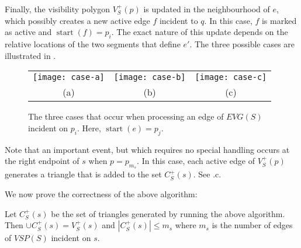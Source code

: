 \documentclass{patmorin}
\newcommand{\EVG}{\mathit{EVG}}
\newcommand{\VSP}{\mathit{VSP}}
\DeclareMathOperator{\start}{start}
\begin{document}
Finally, the visibility polygon $V^+_S(p)$ is updated in the neighbourhood of
$e$, which possibly creates a new active edge $f$ incident to $q$.  In this
case, $f$ is marked as active and $\start(f)=p_i$.  The exact nature of
this update depends on the relative locations of the two segments that
define $e'$.  The three possible cases are illustrated in .

\begin{figure}
  \begin{center}
    \begin{tabular}{|c|c|c|}
      \texttt{[image: case-a]} &
      \texttt{[image: case-b]} &
      \texttt{[image: case-c]} \\
      (a) & (b) & (c)
    \end{tabular}
  \end{center}
  \caption{The three cases that occur when processing an edge of $\EVG(S)$
incident on $p_i$.  Here, $\start(e)=p_j$.}
\end{figure}

Note that an important event, but which requires no special handling occurs
at the right endpoint of $s$ when $p=p_{m_s}$.  In this case, each active
edge of $V^+_S(p)$ generates a triangle that is added to the set $C^+_S(s)$.
See .c.

We now prove the correctness of the above algorithm:

\begin{lem}
Let $C^+_S(s)$ be the set of triangles generated by running the above
algorithm.  Then $\cup C^+_S(s) = V^+_S(s)$ and $|C^+_S(s)|\le m_s$ where
$m_s$ is the number of edges of $\VSP(S)$ incident on $s$.
\end{lem}
\end{document}
